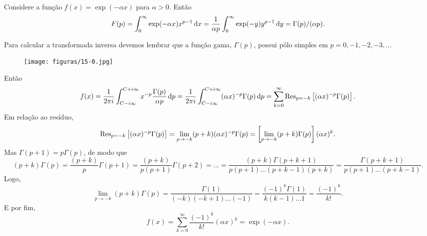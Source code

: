 \begin{exem}
  Considere a função $f(x) = \exp(-\alpha x)$ para $\alpha > 0$. Então
  \begin{dmath*}
    F(p) = \int_{0}^{\infty} \exp(-\alpha x) x^{p - 1} \vi{x}
    = \frac{1}{\alpha p} \int_{0}^{\infty} \exp(-y) y^{p - 1} \vi{y}
    = \Gamma(p) / (\alpha p).
  \end{dmath*}

  Para calcular a transformada inversa devemos lembrar que a função gama,
  $\Gamma(p)$, possui pólo simples em $p = 0, -1, -2, -3, \ldots$
  \begin{figure}[htb]
    \centering
    \texttt{[image: figuras/15-0.jpg]}
  \end{figure}
  Então
  \begin{dmath*}
    f(x) = \frac{1}{2 \pi i} \int_{C - i \infty}^{C + i \infty} x^{-p}
    \frac{\Gamma(p)}{\alpha p} \vi{p}
    = \frac{1}{2 \pi i} \int_{C - i \infty}^{C + i \infty} (\alpha x)^{-p}
    \Gamma(p) \vi{p}
    = \sum_{k = 0}^{\infty} \Res_{p = -k}\left[ (\alpha x)^{-p} \Gamma(p)
    \right].
  \end{dmath*}
  Em relação ao resíduo,
  \begin{dmath*}
    \Res_{p = -k}\left[ (\alpha x)^{-p} \Gamma(p) \right] = \lim_{p \to -k} (p +
    k) (\alpha x)^{-p} \Gamma(p)
    = \left[ \lim_{p \to -k} (p + k) \Gamma(p) \right] (\alpha x)^k.
  \end{dmath*}
  Mas $\Gamma(p + 1) = p \Gamma(p)$, de modo que
  \begin{dmath*}
    (p + k) \Gamma(p) = \frac{(p + k)}{p} \Gamma(p + 1)
    = \frac{(p + k)}{p (p + 1)} \Gamma(p + 2)
    = \ldots
    = \frac{(p + k) \Gamma(p + k + 1)}{p (p + 1) \ldots (p + k - 1) (p + k)}
    = \frac{\Gamma(p + k + 1)}{p (p + 1) \ldots (p + k - 1)}.
  \end{dmath*}
  Logo,
  \begin{dmath*}
    \lim_{p \to -k} (p + k) \Gamma(p) = \frac{\Gamma(1)}{(-k) (-k + 1) \ldots
    (-1)}
    = \frac{(-1)^{k} \Gamma(1)}{k (k - 1) \ldots 1}
    = \frac{(-1)^k}{k!}.
  \end{dmath*}
  E por fim,
  \begin{dmath*}
    f(x) = \sum_{k = 0}^{\infty} \frac{(-1)^k}{k!} (\alpha x)^k
    = \exp(-\alpha x).
  \end{dmath*}
\end{exem}


